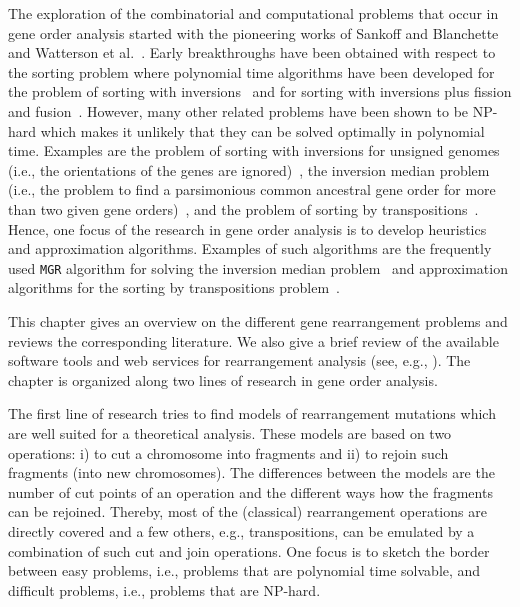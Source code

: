 \documentclass{svmult}
\begin{document}

The exploration of the combinatorial and computational problems that occur in gene order analysis started with the pioneering 
works of Sankoff and Blanchette~\cite{Sankoff_1992} and Watterson et al.~\cite{Watterson_1982}. Early breakthroughs have been 
obtained with respect to the sorting problem where polynomial time algorithms have been developed for the problem of sorting 
with inversions~\cite{Hannenhalli_1999} and for sorting with inversions plus fission and fusion~\cite{Hannenhalli_1995}. However, 
many other related problems have been shown to be NP-hard which makes it
unlikely that they can be solved optimally in polynomial time. Examples are the problem of sorting with inversions for unsigned 
genomes (i.e., the orientations of the genes are ignored)~\cite{Caprara_1997},
the inversion median problem (i.e., the problem to find a parsimonious common ancestral gene order for more than two given gene orders)~\cite{Caprara_2003}, 
and the problem of sorting by transpositions~\cite{Bulteau_2012}. Hence, one focus of the research in gene order 
analysis is to develop heuristics and approximation algorithms. Examples of such
algorithms are the frequently used \texttt{MGR} algorithm for solving the
inversion median problem~\cite{Bourque_2002} and approximation algorithms for the sorting by transpositions problem~\cite{Elias_2006}.

This chapter gives an overview on the different gene rearrangement problems and reviews the corresponding literature. 
We also give a brief review of the available software tools 
and web services for rearrangement analysis (see, e.g., ).
The chapter is organized along two lines of research in gene order analysis. 

The first line of research tries to find models of rearrangement mutations which are well suited for a theoretical analysis. 
These models are based on two operations: i) to cut a chromosome into fragments and ii) to rejoin such fragments (into new chromosomes). 
The differences between the models are the number of cut points of an operation and the different ways how the fragments can be rejoined. 
Thereby, most of the (classical) rearrangement operations are directly covered
and a few others, e.g., transpositions, can be emulated by a combination of such cut and join operations. One focus is to sketch the 
border between easy problems, i.e., problems that are polynomial time solvable, and difficult problems, i.e., problems that are NP-hard.
 
\end{document}

